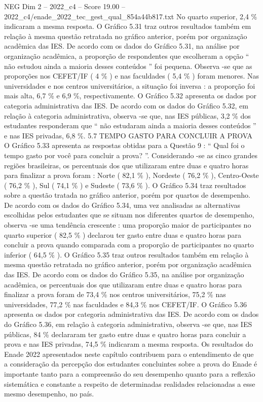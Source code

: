 \begin{textsample}{NEG Dim 2 – 2022\_c4 – Score 19.00 – 2022\_c4/enade\_2022\_tec\_gest\_qual\_854a44b817.txt}
No quarto superior, 2,4 \% indicaram a mesma resposta.
O Gráfico 5.31 traz outros resultados também em relação à mesma questão retratada no gráfico anterior, porém por organização acadêmica das IES.
De acordo com os dados do Gráfico 5.31, na análise por organização acadêmica, a proporção de respondentes que escolheram a opção “ não estudou ainda a maioria desses conteúdos ” foi pequena.
Observa -se que as proporções nos CEFET/IF ( 4 \% ) e nas faculdades ( 5,4 \% ) foram menores.
Nas universidades e nos centros universitários, a situação foi inversa : a proporção foi mais alta, 6,7 \% e 6,9 \%, respectivamente.
O Gráfico 5.32 apresenta os dados por categoria administrativa das IES.
De acordo com os dados do Gráfico 5.32, em relação à categoria administrativa, observa -se que, nas IES públicas, 3,2 \% dos estudantes responderam que “ não estudaram ainda a maioria desses conteúdos ” e nas IES privadas, 6,8 \%. 5.7 TEMPO GASTO PARA CONCLUIR A PROVA O Gráfico 5.33 apresenta as respostas obtidas para a Questão 9 : “ Qual foi o tempo gasto por você para concluir a prova? ”.
Considerando -se as cinco grandes regiões brasileiras, os percentuais dos que utilizaram entre duas e quatro horas para finalizar a prova foram : Norte ( 82,1 \% ), Nordeste ( 76,2 \% ), Centro-Oeste ( 76,2 \% ), Sul ( 74,1 \% ) e Sudeste ( 73,6 \% ).
O Gráfico 5.34 traz resultados sobre a questão tratada no gráfico anterior, porém por quartos de desempenho.
De acordo com os dados do Gráfico 5.34, uma vez analisadas as alternativas escolhidas pelos estudantes que se situam nos diferentes quartos de desempenho, observa -se uma tendência crescente : uma proporção maior de participantes no quarto superior ( 82,5 \% ) declarou ter gasto entre duas e quatro horas para concluir a prova quando comparada com a proporção de participantes no quarto inferior ( 64,5 \% ).
O Gráfico 5.35 traz outros resultados também em relação à mesma questão retratada no gráfico anterior, porém por organização acadêmica das IES.
De acordo com os dados do Gráfico 5.35, na análise por organização acadêmica, os percentuais dos que utilizaram entre duas e quatro horas para finalizar a prova foram de 73,4 \% nos centros universitários, 75,2 \% nas universidades, 77,2 \% nas faculdades e 84,3 \% nos CEFET/IF.
O Gráfico 5.36 apresenta os dados por categoria administrativa das IES.
De acordo com os dados do Gráfico 5.36, em relação à categoria administrativa, observa -se que, nas IES públicas, 84 \% declararam ter gasto entre duas e quatro horas para concluir a prova e nas IES privadas, 74,5 \% indicaram a mesma resposta.
Os resultados do Enade 2022 apresentados neste capítulo contribuem para o entendimento de que a consideração da percepção dos estudantes concluintes sobre a prova do Enade é importante tanto para a compreensão do seu desempenho quanto para a reflexão sistemática e constante a respeito de determinadas realidades relacionadas a esse mesmo desempenho, no país.

\end{textsample}
